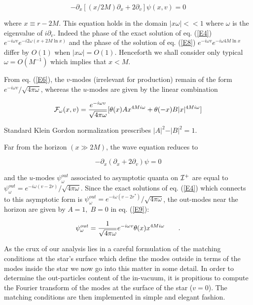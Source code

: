 \documentclass[12pt]{article}
\def\sqr#1#2{{\vcenter{\vbox{\hrule height.#2pt
          \hbox{\vrule width.#2pt height#1pt \kern#1pt
           \vrule width.#2pt}
           \hrule height.#2pt}}}}
\def\square{\mathchoice\sqr68\sqr68\sqr{4.2}6\sqr{3}6}
\begin{document}
\begin{equation}
\label{E8}
-\partial_x [ ( x / 2 M) \partial_x + 2 \partial_v ] \psi (x, v) = 0
\end{equation}

\noindent where $ x \equiv r - 2 M$. This equation holds in the domain 
$\vert x \omega \vert <<1$
where $\omega$ is the eigenvalue of $i \partial_v$. Indeed
the phase of the exact solution of eq. (\ref{E4}) $e^{-i \omega
v}e^{-i 2 \omega ( x+ 2M \ln x)}$ and the phase of the
solution of  eq. (\ref{E8})  $e^{-i \omega v}e^{-i  \omega 4M \ln
x}$ differ by $O(1)$ when $\vert x \omega \vert =O(1)$.
Henceforth we shall consider only typical $\omega =
O(M^{-1})$ which implies that $x<M$.

\par From eq. (\ref{E6}), the 
$v$-modes (irrelevant for production) remain of the form $ e^{-i \omega v} / \sqrt{4 \pi \omega}$, whereas the
$u$-modes are given by the linear combination

\begin{equation}
\label{E9}
{\cal F}_\omega (x, v) = { e^{-i \omega v}\over \sqrt{4 \pi \omega} }[ \theta
(x)
 A x^{4 M i \omega} + \theta (- x) B \vert x \vert^{4 M i \omega}] 
\end{equation}

\noindent Standard Klein Gordon normalization prescribes $ \vert A \vert^2 -
\vert B \vert^2 = 1$.

 Far from the horizon $ (x \gg 2 M)$, the wave equation reduces to

\begin{equation}
\label{E10}
- \partial_x \left( \partial_x + 2 \partial_v \right) \psi
=0
\end{equation}

\noindent and the $u$-modes $ \psi_\omega^{out}$ associated to asymptotic quanta
on $  {\cal I} ^+$ are equal to $ \psi _\omega ^{out} = e^{- i \omega ( v - 2
r)} / \sqrt{4 \pi \omega  }$. Since the
exact solutions of eq. (\ref{E4}) which connects to this asymptotic form is $
\psi_\omega ^{out} = e^{- i \omega (v - 2 r^*)} / \sqrt{4 \pi \omega}$, the
out-modes near the horizon are given by $ A = 1, \; B = 0$ in eq. (\ref{E9}):


\begin{equation}
\label{E11}
\psi_\omega ^{out} = {1 \over  \sqrt{4 \pi \omega}} e^{-i \omega v} 
\theta
(x) x^{ 4 M  i \omega}\qquad .  
\end{equation}

As the crux of our analysis lies in a careful formulation of the matching
conditions at the star's surface which define  the modes outside in terms of
the modes inside the star  we now go into this
matter in some detail.
In order to determine the out-particles content of the in-vacuum, it is 
propitious to compute the Fourier transform of the modes 
at the surface of the star ($ v  = 0$). The matching conditions are
then implemented in simple and elegant fashion.
\end{document}
